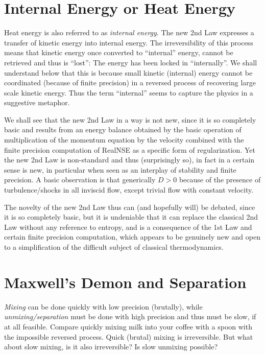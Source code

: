 \section{Internal Energy or Heat Energy}

Heat energy is also referred to as \emph{internal energy}. The
new 2nd Law expresses a transfer of kinetic
energy into internal energy. The irreversibility of this process
means that kinetic energy once converted to ``internal'' energy,
cannot be retrieved and thus is ``lost'': The energy has been
locked in ``internally''. We shall understand below that
this is because small kinetic (internal) energy cannot
be coordinated (because of finite precision) in a reversed process of 
recovering large scale kinetic energy. 
Thus the term ``internal'' seems to capture the physics in a suggestive
metaphor.

We shall see that the new 2nd Law in a way is not new, since it is
so completely basic and results from an energy balance obtained by
the basic operation of multiplication of the momentum equation
by the velocity combined with the finite precision computation
of RealNSE as a specific form of regularization.  Yet the new 2nd Law is 
non-standard and thus (surprisingly so), in fact in a certain sense is new,
in particular when seen as an interplay of stability and finite precision. 
A basic observation is that generically $D>0$ because of the presence of 
turbulence/shocks in all inviscid flow, except trivial flow
with constant velocity. 

The novelty of the new 2nd Law thus can (and hopefully will) be debated, 
since it is so completely basic, but it is undeniable that it can replace the 
classical 2nd Law without any reference to entropy, 
and is a consequence of the 1st Law and certain finite precision
computation, which appears to 
be genuinely new and open to a simplification of the difficult subject 
of classical thermodynamics.




\section{Maxwell's Demon and Separation}

\emph{Mixing} can be done quickly with low precision (brutally),
while \emph{unmixing/separation} must be done with high precision and 
thus must be slow, if at all feasible.
Compare quickly mixing milk into your coffee with a spoon 
with the impossible reversed process. 
Quick (brutal) mixing is irreversible. But what about slow mixing,
is it also irreversible? Is slow unmixing possible?  


